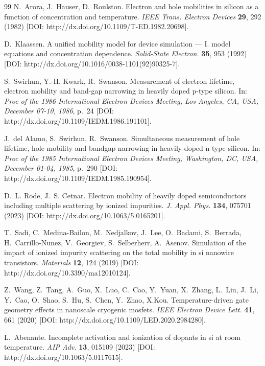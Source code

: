 \documentclass[fleqn,twoside,twocolumn,nofootinbib,showkeys]{revtex4} %
\begin{document}
\begin{thebibliography}{99}
N.~Arora, J.~Hauser, D.~Roulston. Electron and hole mobilities in silicon as a function of concentration and temperature. \textit{IEEE Trans. Electron Devices} \textbf{29}, 292 (1982) [DOI: http://dx.doi.org/10.1109/T-ED.1982.20698].

D.~Klaassen. A unified mobility model for device simulation --- I. model equations and concentration dependence. \textit{Solid-State Electron.} \textbf{35}, 953 (1992) [DOI: http://dx.doi.org/10.1016/0038-1101(92)90325-7].

S.~Swirhun, Y.-H. Kwark, R.~Swanson. Measurement of electron lifetime, electron mobility and band-gap narrowing in heavily doped p-type silicon. 
In: \textit{Proc of the 1986 International Electron Devices Meeting, Los Angeles, CA, USA, December 07-10, 1986}, p.~24  [DOI: http://dx.doi.org/10.1109/IEDM.1986.191101].

J.~del Alamo, S.~Swirhun, R.~Swanson. Simultaneous measurement of hole lifetime, hole mobility and bandgap narrowing in heavily doped n-type silicon. 
In: \textit{Proc of the 1985 International Electron Devices Meeting,  Washington, DC, USA, December 01-04, 1985}, p.~290  [DOI: http://dx.doi.org/10.1109/IEDM.1985.190954].

D.~L. Rode, J.~S. Cetnar. Electron mobility of heavily doped semiconductors including multiple scattering by ionized impurities. \textit{J. Appl. Phys.} \textbf{134}, 075701 (2023) [DOI: http://dx.doi.org/10.1063/5.0165201].

T.~Sadi, C.~Medina-Bailon, M.~Nedjalkov, J.~Lee, O.~Badami, S.~Berrada, H.~Carrillo-Nunez, V.~Georgiev, S.~Selberherr, A.~Asenov. Simulation of the impact of ionized impurity scattering on the total mobility in si nanowire transistors. \textit{Materials} \textbf{12}, 124 (2019) [DOI: http://dx.doi.org/10.3390/ma12010124].

Z.~Wang, Z.~Tang, A.~Guo, X.~Luo, C.~Cao, Y.~Yuan, X.~Zhang, L.~Liu, J.~Li, Y.~Cao, O.~Shao, S.~Hu, S.~Chen, Y.~Zhao, X.Kou. Temperature-driven gate geometry effects in nanoscale cryogenic mosfets. \textit{IEEE Electron Device Lett.} \textbf{41}, 661 (2020) [DOI: http://dx.doi.org/10.1109/LED.2020.2984280].

L.~Abenante. Incomplete activation and ionization of dopants in si at room temperature. \textit{AIP Adv.} \textbf{13}, 015109 (2023) [DOI: http://dx.doi.org/10.1063/5.0117615].



\end{thebibliography}
\end{document}
